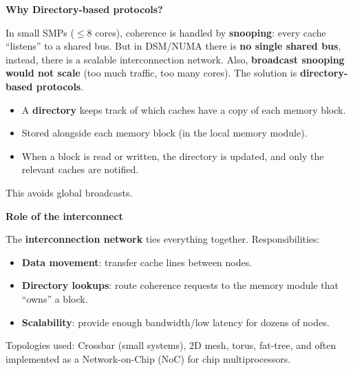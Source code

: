 \highspace
\begin{flushleft}
    \textcolor{Green3}{ \textbf{Why Directory-based protocols?}}
\end{flushleft}
In small SMPs ($\le 8$ cores), coherence is handled by \textbf{snooping}: every cache ``listens'' to a shared bus. But in DSM/NUMA there is \textbf{no single shared bus}, instead, there is a scalable interconnection network. Also, \textbf{broadcast snooping would not scale} (too much traffic, too many cores). The solution is \textbf{directory-based protocols}.
\begin{itemize}
    \item A \textbf{directory} keeps track of which caches have a copy of each memory block.
    \item Stored alongside each memory block (in the local memory module).
    \item When a block is read or written, the directory is updated, and only the relevant caches are notified.
\end{itemize}
This avoids global broadcasts.

\highspace
\begin{flushleft}
    \textcolor{Green3}{ \textbf{Role of the interconnect}}
\end{flushleft}
The \textbf{interconnection network} ties everything together. Responsibilities:
\begin{itemize}
    \item \textbf{Data movement}: transfer cache lines between nodes.
    \item \textbf{Directory lookups}: route coherence requests to the memory module that ``owns'' a block.
    \item \textbf{Scalability}: provide enough bandwidth/low latency for dozens of nodes.
\end{itemize}
Topologies used: Crossbar (small systems), 2D mesh, torus, fat-tree, and often implemented as a Network-on-Chip (NoC) for chip multiprocessors.